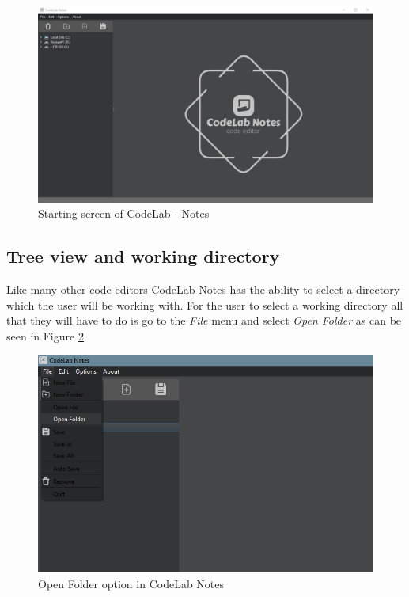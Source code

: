 \documentclass[a4paper, 11pt]{article}
\begin{document}
				\begin{figure}[h]
					\centering
					\includegraphics[scale = .4]{programStartScreen}
					\caption{Starting screen of CodeLab - Notes}
					\label{Fig:Program start screen}
				\end{figure}
			
			\subsection{Tree view and working directory}
				\noindent Like many other code editors CodeLab Notes has the ability to select a directory which the user will be working with. For the user to select a working directory all that they will have to do is go to the \emph{File} menu and select \emph{Open Folder} as can be seen in Figure \ref{Fig:Open Folder option in CodeLab Notes}
				
				\begin{figure}[h]
					\centering
					\includegraphics[scale=.7]{openFolderOption}
					\caption{Open Folder option in CodeLab Notes}
					\label{Fig:Open Folder option in CodeLab Notes}
				\end{figure}
			
\end{document}
